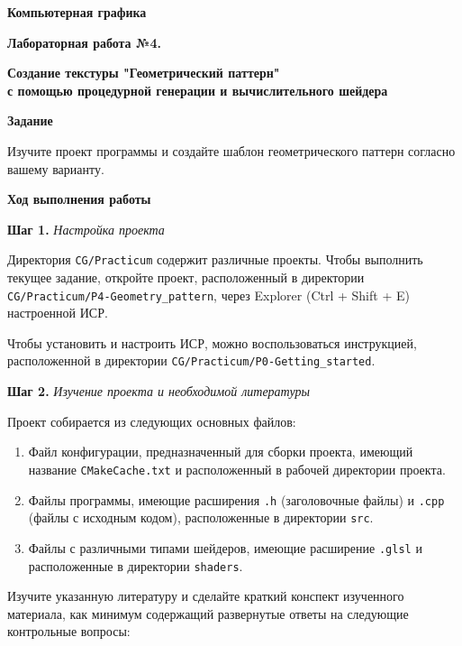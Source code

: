 \documentclass[a4paper,12pt]{article}
\begin{document}
\fontsize{14pt}{16pt}\selectfont
\begin{center}
    \textbf{{\Large Компьютерная графика}}
    
    \textbf{{\large Лабораторная работа №4. }}
    
    \textbf{{\large Создание текстуры "Геометрический паттерн" \\ с помощью процедурной генерации и вычислительного шейдера}}
    \end{center}
    
    \textbf{Задание}
    
    Изучите проект программы и создайте шаблон геометрического паттерн согласно вашему варианту.
    
    \textbf{Ход выполнения работы}
    
    \textbf{Шаг 1.} \textit{Настройка проекта}
    
    Директория \texttt{CG/Practicum} содержит различные проекты. Чтобы выполнить текущее задание, откройте проект, расположенный в директории \\
    \texttt{CG/Practicum/P4-Geometry\_pattern}, через Explorer (Ctrl + Shift + E) настроенной ИСР.
    
    Чтобы установить и настроить ИСР, можно воспользоваться инструкцией, расположенной в директории \texttt{CG/Practicum/P0-Getting\_started}.
    
    \textbf{Шаг 2.} \textit{Изучение проекта и необходимой литературы}
    
    Проект собирается из следующих основных файлов:
    
    \begin{enumerate}
        \item Файл конфигурации, предназначенный для сборки проекта, имеющий название \texttt{CMakeCache.txt} и расположенный в рабочей директории проекта.
        \item Файлы программы, имеющие расширения \texttt{.h} (заголовочные файлы) и \texttt{.cpp} (файлы с исходным кодом), расположенные в директории \texttt{src}.
        \item Файлы с различными типами шейдеров, имеющие расширение \texttt{.glsl} и расположенные в директории \texttt{shaders}.
    \end{enumerate}
    
    Изучите указанную литературу и сделайте краткий конспект изученного материала, как минимум содержащий развернутые ответы на следующие контрольные вопросы:
    
\end{document}
